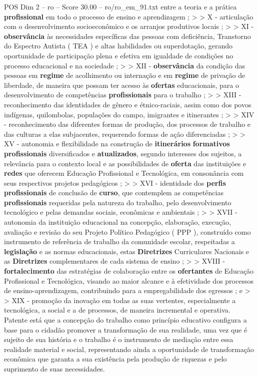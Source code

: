 \begin{textsample}{POS Dim 2 – ro – Score 30.00 – ro/ro\_em\_91.txt}
entre a teoria e a prática \textbf{profissional} em todo o processo de ensino e aprendizagem ; > > X - articulação com o desenvolvimento socioeconômico e os arranjos produtivos locais ; > > XI - \textbf{observância} às necessidades específicas das pessoas com deficiência, Transtorno do Espectro Autista ( TEA ) e altas habilidades ou superdotação, gerando oportunidade de participação plena e efetiva em igualdade de condições no processo educacional e na sociedade ; > > XII - \textbf{observância} da condição das pessoas em \textbf{regime} de acolhimento ou internação e em \textbf{regime} de privação de liberdade, de maneira que possam ter acesso às \textbf{ofertas} educacionais, para o desenvolvimento de competências \textbf{profissionais} para o trabalho ; > > XIII - reconhecimento das identidades de gênero e étnico-raciais, assim como dos povos indígenas, quilombolas, populações do campo, imigrantes e itinerantes ; > > XIV - reconhecimento das diferentes formas de produção, dos processos de trabalho e das culturas a elas subjacentes, requerendo formas de ação diferenciadas ; > > XV - autonomia e flexibilidade na construção de \textbf{itinerários} \textbf{formativos} \textbf{profissionais} diversificados e \textbf{atualizados}, segundo interesses dos sujeitos, a relevância para o contexto local e as possibilidades de \textbf{oferta} das instituições e \textbf{redes} que oferecem Educação Profissional e Tecnológica, em consonância com seus respectivos projetos pedagógicos ; > > XVI - identidade dos \textbf{perfis} \textbf{profissionais} de conclusão de \textbf{curso}, que contemplem as competências \textbf{profissionais} requeridas pela natureza do trabalho, pelo desenvolvimento tecnológico e pelas demandas sociais, econômicas e ambientais ; > > XVII - autonomia da instituição educacional na concepção, elaboração, execução, avaliação e revisão do seu Projeto Político Pedagógico ( PPP ), construído como instrumento de referência de trabalho da comunidade escolar, respeitadas a \textbf{legislação} e as normas educacionais, estas \textbf{Diretrizes} Curriculares Nacionais e as \textbf{Diretrizes} complementares de cada sistema de ensino ; > > XVIII - \textbf{fortalecimento} das estratégias de colaboração entre os \textbf{ofertantes} de Educação Profissional e Tecnológica, visando ao maior alcance e à efetividade dos processos de ensino-aprendizagem, contribuindo para a empregabilidade dos egressos ; e > > XIX - promoção da inovação em todas as suas vertentes, especialmente a tecnológica, a social e a de processos, de maneira incremental e operativa.
Patente está que a concepção do trabalho como princípio educativo configura a base para o cidadão promover a transformação de sua realidade, uma vez que é sujeito de sua história e o trabalho é o instrumento de mediação entre essa realidade material e social, representando ainda a oportunidade de transformação econômica que garanta a sua existência pela produção de riquezas e pelo suprimento de suas necessidades.

\end{textsample}
